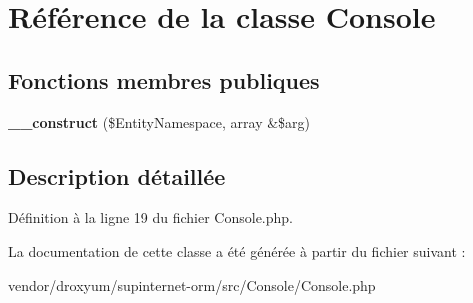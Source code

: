 \hypertarget{class_o_r_m_1_1_console_1_1_console}{}\section{Référence de la classe Console}
\label{class_o_r_m_1_1_console_1_1_console}
\subsection*{Fonctions membres publiques}
\begin{DoxyCompactItemize}
\item 
{\bfseries \+\_\+\+\_\+construct} (\$Entity\+Namespace, array \&\$arg)\hypertarget{class_o_r_m_1_1_console_1_1_console_a3df89a743b8dabad43ce656c82aca2a4}{}\label{class_o_r_m_1_1_console_1_1_console_a3df89a743b8dabad43ce656c82aca2a4}

\end{DoxyCompactItemize}


\subsection{Description détaillée}


Définition à la ligne 19 du fichier Console.\+php.



La documentation de cette classe a été générée à partir du fichier suivant \+:\begin{DoxyCompactItemize}
\item 
vendor/droxyum/supinternet-\/orm/src/\+Console/Console.\+php\end{DoxyCompactItemize}
